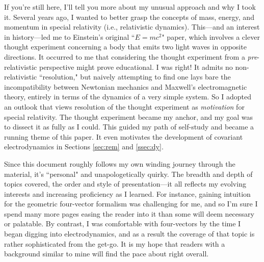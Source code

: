 \documentclass[12pt]{article}
\begin{document}
If you're still here, I'll tell you more about my unusual approach and why I took it. Several years ago, I wanted to better grasp the concepts of mass, energy, and momentum in special relativity (i.e., relativistic dynamics). This---and an interest in history---led me to Einstein's original ``$E = mc^2$" paper, which involves a clever thought experiment concerning a body that emits two light waves in opposite directions. It occurred to me that considering the thought experiment from a \emph{pre}-relativistic perspective might prove educational. I was right! It admits no non-relativistic ``resolution," but naively attempting to find one lays bare the incompatibility between Newtonian mechanics and Maxwell's electromagnetic theory, entirely in terms of the dynamics of a very simple system. So I adopted an outlook that views resolution of the thought experiment as \emph{motivation} for special relativity. The thought experiment became my anchor, and my goal was to dissect it as fully as I could. This guided my path of self-study and became a running theme of this paper. It even motivates the development of covariant electrodynamics in Sections \ref{sec:rem} and \ref{ssec:dy}.

Since this document roughly follows my own winding journey through the material, it's ``personal" and unapologetically quirky. The breadth and depth of topics covered, the order and style of presentation---it all reflects my evolving interests and increasing proficiency as I learned. For instance, gaining intuition for the geometric four-vector formalism was challenging for me, and so I'm sure I spend many more pages easing the reader into it than some will deem necessary or palatable. By contrast, I was comfortable with four-vectors by the time I began digging into electrodynamics, and as a result the coverage of that topic is rather sophisticated from the get-go. It is my hope that readers with a background similar to mine will find the pace about right overall.
\end{document}

